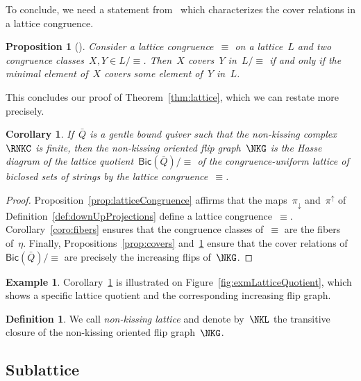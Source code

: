 \documentclass{memo-l}
\newtheorem{corollary}[theorem]{Corollary}
\newtheorem{proposition}[theorem]{Proposition}
\theoremstyle{definition}
\newtheorem{definition}[theorem]{Definition}
\newtheorem{example}[theorem]{Example}
\newcommand{\fref}[1]{Figure~\ref{#1}} %
\newcommand{\darkblue}{\color{darkblue}} %
\newcommand{\defn}[1]{\textsl{\darkblue #1}} %
\newcommand{\Bicl}[1]{\mathsf{Bic}(#1)} %
\newcommand{\projDown}{\pi_\downarrow} %
\newcommand{\projUp}{\pi^\uparrow} %
\begin{document}
To conclude, we need a statement from~\cite{Reading-HopfAlgebras} which characterizes the cover relations in a lattice congruence.

\begin{proposition}[{\cite[Prop.~2.2]{Reading-HopfAlgebras}}]
\label{prop:characterizationCoversLatticeQuotient}
Consider a lattice congruence~$\equiv$ on a lattice~$L$ and two congruence classes~$X, Y \in L/{\equiv}$.
Then~$X$ covers~$Y$ in~$L/{\equiv}$ if and only if the minimal element of~$X$ covers some element of~$Y$ in~$L$.
\end{proposition}

This concludes our proof of Theorem~\ref{thm:lattice}, which we can restate more precisely.

\begin{corollary}
\label{coro:finalLatticeQuotient}
If~$\bar Q$ is a gentle bound quiver such that the non-kissing complex~$\RNKC$ is finite, then the non-kissing oriented flip graph~$\NKG$ is the Hasse diagram of the lattice quotient~$\Bicl{\bar Q}/{\equiv}$ of the congruence-uniform lattice of biclosed sets of strings by the lattice congruence~$\equiv$.
\end{corollary}

\begin{proof}
Proposition~\ref{prop:latticeCongruence} affirms that the maps~$\projDown$ and~$\projUp$ of Definition~\ref{def:downUpProjections} define a lattice congruence~$\equiv$.
Corollary~\ref{coro:fibers} ensures that the congruence classes of~$\equiv$ are the fibers of~$\eta$.
Finally, Propositions~\ref{prop:covers} and~\ref{prop:characterizationCoversLatticeQuotient} ensure that the cover relations of~$\Bicl{\bar Q}/{\equiv}$ are precisely the increasing flips of~$\NKG$.
\end{proof}

\begin{example}
Corollary~\ref{coro:finalLatticeQuotient} is illustrated on \fref{fig:exmLatticeQuotient}, which shows a specific lattice quotient and the corresponding increasing flip graph.
\end{example}

\begin{definition}\label{def:NKL}
We call \defn{non-kissing lattice} and denote by~$\NKL$ the transitive closure of the non-kissing oriented flip graph~$\NKG$.
\end{definition}

\subsection{Sublattice}
\end{document}
